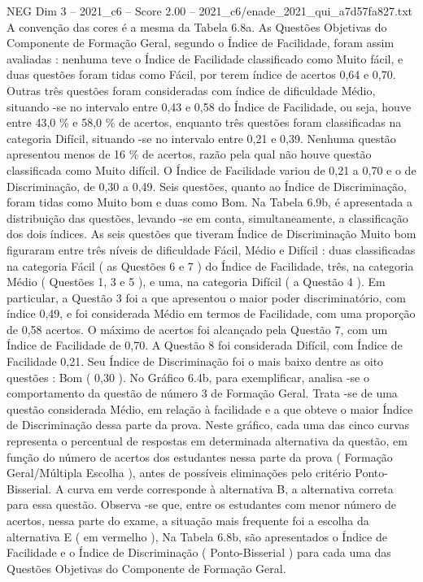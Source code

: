 \begin{textsample}{NEG Dim 3 – 2021\_c6 – Score 2.00 – 2021\_c6/enade\_2021\_qui\_a7d57fa827.txt}
A convenção das cores é a mesma da Tabela 6.8a.
As Questões Objetivas do Componente de Formação Geral, segundo o Índice de Facilidade, foram assim avaliadas : nenhuma teve o Índice de Facilidade classificado como Muito fácil, e duas questões foram tidas como Fácil, por terem índice de acertos 0,64 e 0,70.
Outras três questões foram consideradas com índice de dificuldade Médio, situando -se no intervalo entre 0,43 e 0,58 do Índice de Facilidade, ou seja, houve entre 43,0 \% e 58,0 \% de acertos, enquanto três questões foram classificadas na categoria Difícil, situando -se no intervalo entre 0,21 e 0,39.
Nenhuma questão apresentou menos de 16 \% de acertos, razão pela qual não houve questão classificada como Muito difícil.
O Índice de Facilidade variou de 0,21 a 0,70 e o de Discriminação, de 0,30 a 0,49.
Seis questões, quanto ao Índice de Discriminação, foram tidas como Muito bom e duas como Bom.
Na Tabela 6.9b, é apresentada a distribuição das questões, levando -se em conta, simultaneamente, a classificação dos dois índices.
As seis questões que tiveram Índice de Discriminação Muito bom figuraram entre três níveis de dificuldade Fácil, Médio e Difícil : duas classificadas na categoria Fácil ( as Questões 6 e 7 ) do Índice de Facilidade, três, na categoria Médio ( Questões 1, 3 e 5 ), e uma, na categoria Difícil ( a Questão 4 ).
Em particular, a Questão 3 foi a que apresentou o maior poder discriminatório, com índice 0,49, e foi considerada Médio em termos de Facilidade, com uma proporção de 0,58 acertos.
O máximo de acertos foi alcançado pela Questão 7, com um Índice de Facilidade de 0,70.
A Questão 8 foi considerada Difícil, com Índice de Facilidade 0,21.
Seu Índice de Discriminação foi o mais baixo dentre as oito questões : Bom ( 0,30 ).
No Gráfico 6.4b, para exemplificar, analisa -se o comportamento da questão de número 3 de Formação Geral.
Trata -se de uma questão considerada Médio, em relação à facilidade e a que obteve o maior Índice de Discriminação dessa parte da prova.
Neste gráfico, cada uma das cinco curvas representa o percentual de respostas em determinada alternativa da questão, em função do número de acertos dos estudantes nessa parte da prova ( Formação Geral/Múltipla Escolha ), antes de possíveis eliminações pelo critério Ponto-Bisserial.
A curva em verde corresponde à alternativa B, a alternativa correta para essa questão.
Observa -se que, entre os estudantes com menor número de acertos, nessa parte do exame, a situação mais frequente foi a escolha da alternativa E ( em vermelho ), Na Tabela 6.8b, são apresentados o Índice de Facilidade e o Índice de Discriminação ( Ponto-Bisserial ) para cada uma das Questões Objetivas do Componente de Formação Geral.

\end{textsample}
